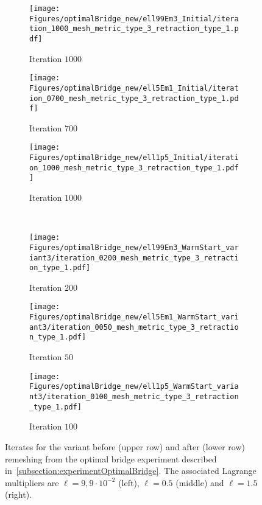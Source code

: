\begin{figure}
	\begin{center}
	\begin{subfigure}{0.32\textwidth}
		\centering
		\texttt{[image: Figures/optimalBridge\_new/ell99Em3\_Initial/iteration\_1000\_mesh\_metric\_type\_3\_retraction\_type\_1.pdf]}
		\caption{Iteration $1000$}
	\end{subfigure}
	\hfill
	\begin{subfigure}{0.32\textwidth}
		\centering
		\texttt{[image: Figures/optimalBridge\_new/ell5Em1\_Initial/iteration\_0700\_mesh\_metric\_type\_3\_retraction\_type\_1.pdf]}
		\caption{Iteration $700$}
	\end{subfigure}
	\hfill
	\begin{subfigure}{0.32\textwidth}
		\centering
		\texttt{[image: Figures/optimalBridge\_new/ell1p5\_Initial/iteration\_1000\_mesh\_metric\_type\_3\_retraction\_type\_1.pdf]}
		\caption{Iteration $1000$}
	\end{subfigure}
	\\
	\begin{subfigure}{0.32\textwidth}
		\centering
		\texttt{[image: Figures/optimalBridge\_new/ell99Em3\_WarmStart\_variant3/iteration\_0200\_mesh\_metric\_type\_3\_retraction\_type\_1.pdf]}
		\caption{Iteration $200$}
	\end{subfigure}
	\hfill
	\begin{subfigure}{0.32\textwidth}
		\centering
		\texttt{[image: Figures/optimalBridge\_new/ell5Em1\_WarmStart\_variant3/iteration\_0050\_mesh\_metric\_type\_3\_retraction\_type\_1.pdf]}
			\caption{Iteration $50$}
	\end{subfigure}
	\hfill
	\begin{subfigure}{0.32\textwidth}
		\centering
		\texttt{[image: Figures/optimalBridge\_new/ell1p5\_WarmStart\_variant3/iteration\_0100\_mesh\_metric\_type\_3\_retraction\_type\_1.pdf]}
			\caption{Iteration $100$}
	\end{subfigure}
\end{center}
	\caption{Iterates for the variant \CompEuc before (upper row) and after (lower row) remeshing from the optimal bridge experiment described in~\cref{subsection:experimentOptimalBridge}. The associated Lagrange multipliers are $\ell = 9,9 \cdot 10^{-2}$ (left), $\ell = 0.5$ (middle) and $\ell=1.5$ (right).}
	\label{fig:iterations_before_after_remeshing}
\end{figure}



